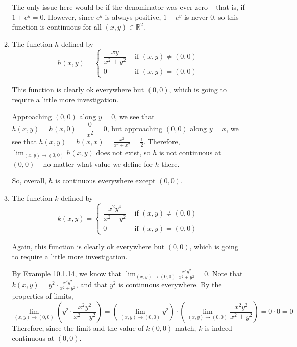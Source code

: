 \documentclass[10pt]{article}
\newcommand{\R}{\mathbb{R}}
\newenvironment{red}{\color{red}}{\ignorespacesafterend}
\begin{document}
\begin{enumerate}[leftmargin=0pt]
\begin{enumerate}
    \begin{red}
    The only issue here would be if the denominator was ever zero -- that is, if $1+e^y = 0$. However, since $e^y$ is always positive, $1+e^y$ is never 0, so this function is continuous for all $(x, y)\in \R^2$.
    \end{red}
    \item The function $h$ defined by \begin{equation*}
    h(x,y) = \begin{cases} 
        \dfrac{xy}{x^2+y^2} & \textrm{ if } (x,y) \neq (0,0)  \\ 
        0 & \textrm{ if } (x,y) = (0,0) 
    \end{cases}
    \end{equation*}
    
    \begin{red}
    This function is clearly ok everywhere but $(0,0)$, which is going to require a little more investigation. 
    
    Approaching $(0,0)$ along $y=0$, we see that $h(x,y) = h(x,0) = \dfrac{0}{x^2} = 0$, but approaching $(0, 0)$ along $y=x$, we see that $\displaystyle h(x, y) = h(x,x) = \frac{x^2}{x^2+x^2} = \frac{1}{2} $. Therefore, $\displaystyle\lim_{(x,y)\to(0,0)}h(x,y)$ does not exist, so $h$ is not continuous at $(0,0)$ -- no matter what value we define for $h$ there.
    
    So, overall, $h$ is continuous everywhere except $(0,0)$.
    \end{red}
    \item The function $k$ defined by
    \begin{equation*}
    k(x,y) = \begin{cases} 
        \dfrac{x^2y^4}{x^2+y^2} & \textrm{ if } (x,y) \neq (0,0)  \\ 
        0 & \textrm{ if } (x,y) = (0,0) 
    \end{cases}
    \end{equation*}
    
    \begin{red}
    {\everymath{\displaystyle}
    Again, this function is clearly ok everywhere but $(0,0)$, which is going to require a little more investigation.
    
    By Example 10.1.14, we know that $\lim_{(x,y)\to(0,0)} \frac{x^2y^2}{x^2+y^2} =0.$ Note that $k(x,y) = y^2 \cdot \frac{x^2y^2}{x^2+y^2}$, and that $y^2$ is continuous everywhere. By the properties of limits, 
    \[\lim_{(x,y)\to(0,0)}  \left(y^2 \cdot \frac{x^2y^2}{x^2+y^2}\right) = \left(\lim_{(x,y)\to(0,0)} y^2 \right) \cdot \left(\lim_{(x,y)\to(0,0)} \frac{x^2y^2}{x^2+y^2}\right) = 0 \cdot 0 = 0\] Therefore, since the limit and the value of $k(0,0)$ match, $k$ is indeed continuous at $(0,0)$.
    }
    \end{red}
\end{enumerate}


\end{enumerate}
\end{document}

